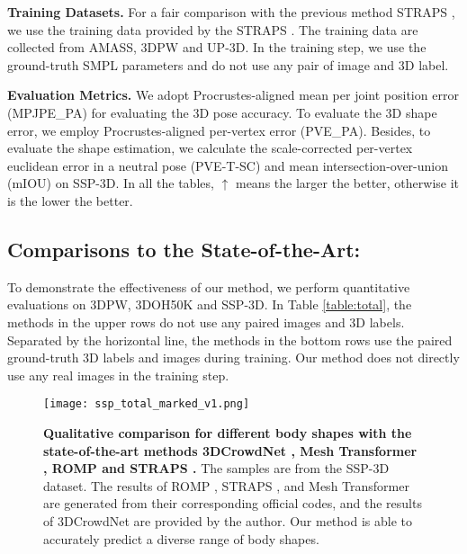 \documentclass[journal]{IEEEtran}
\begin{document}
\noindent\textbf{Training Datasets.} For a fair comparison with the previous method STRAPS \cite{STRAPS2020BMVC}, we use the training data provided by the STRAPS \cite{STRAPS2020BMVC}. The training data are collected from AMASS, 3DPW and UP-3D. In the training step, we use the ground-truth SMPL parameters and do not use any pair of image and 3D label.


\noindent\textbf{Evaluation Metrics.} We adopt Procrustes-aligned \cite{mehta2017monocular} mean per joint position error (MPJPE\_PA) for evaluating the 3D pose accuracy. To evaluate the 3D shape error, we employ Procrustes-aligned per-vertex error (PVE\_PA). Besides, to evaluate the shape estimation, we calculate the scale-corrected per-vertex euclidean error in a neutral pose (PVE-T-SC) and mean intersection-over-union (mIOU) on SSP-3D. In all the tables, $\uparrow$ means the larger the better, otherwise it is the lower the better.


\subsection{Comparisons to the State-of-the-Art:}

To demonstrate the effectiveness of our method, we perform quantitative evaluations on 3DPW, 3DOH50K and SSP-3D. In Table \ref{table:total}, the methods in the upper rows do not use any paired images and 3D labels. Separated by the horizontal line, the methods in the bottom rows use the paired ground-truth 3D labels and images during training. Our method does not directly use any real images in the training step.

\begin{figure*}[htbp]
    
    \centerline{\texttt{[image: ssp\_total\_marked\_v1.png]}}
\caption{\textbf{Qualitative comparison for different body shapes with the state-of-the-art methods 3DCrowdNet \cite{choi20213dcrowdnet}, Mesh Transformer \cite{lin2021end-to-end}, ROMP \cite{ROMP} and STRAPS \cite{STRAPS2020BMVC}.} The samples are from the SSP-3D dataset. The results of ROMP \cite{ROMP}, STRAPS \cite{STRAPS2020BMVC}, and Mesh Transformer \cite{lin2021end-to-end} are generated from their corresponding official codes, and the results of 3DCrowdNet \cite{choi20213dcrowdnet} are provided by  the author. Our method is able to accurately predict a diverse range of body shapes.}
    \label{fig:ssp}
\end{figure*}
\end{document}
